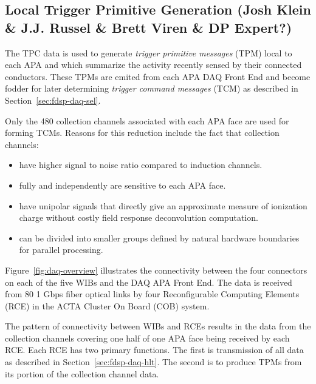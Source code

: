 \subsection{Local Trigger Primitive Generation (Josh Klein \& J.J. Russel \& Brett Viren \& DP Expert?)}
\label{sec:fdsp-daq-ltr}


The TPC data is used to generate \textit{trigger primitive messages}
(TPM) local to each APA and which summarize the activity recently
sensed by their connected conductors.  These TPMs are emited from each
APA DAQ Front End and become fodder for later determining
\textit{trigger command messages} (TCM) as described in
Section~\ref{sec:fdsp-daq-sel}.

Only the 480 collection channels associated with each APA face are
used for forming TCMs.  Reasons for this reduction include the fact
that collection channels:

\begin{itemize}
\item have higher signal to noise ratio compared to induction channels.
\item fully and independently are sensitive to each APA face.
\item have unipolar signals that directly give an approximate measure
  of ionization charge without costly field response deconvolution
  computation.
\item can be divided into smaller groups defined by natural hardware
  boundaries for parallel processing.
\end{itemize}


Figure~\ref{fig:daq-overview} illustrates the connectivity between the
four connectors on each of the five WIBs and the DAQ APA Front End.
The data is received from 80 1 Gbps fiber optical links by four
Reconfigurable Computing Elements (RCE) in the ACTA Cluster On Board
(COB) system. 

The pattern of connectivity between WIBs and RCEs results in the data
from the collection channels covering one half of one APA face being
received by each RCE.  Each RCE has two primary functions.  The first
is transmission of all data as described in
Section~\ref{sec:fdsp-daq-hlt}.  The second is to produce TPMs from
its portion of the collection channel data.

